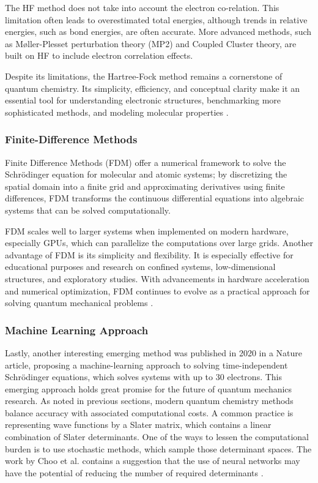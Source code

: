 The HF method does not take into account the electron co-relation. This limitation often leads to overestimated total energies, although trends in relative energies, such as bond energies, are often accurate. More advanced methods, such as Møller-Plesset perturbation theory (MP2) and Coupled Cluster theory, are built on HF to include electron correlation effects.

Despite its limitations, the Hartree-Fock method remains a cornerstone of quantum chemistry. Its simplicity, efficiency, and conceptual clarity make it an essential tool for understanding electronic structures, benchmarking more sophisticated methods, and modeling molecular properties \cite{thijssen2007}.

\subsubsection{Finite-Difference Methods}

Finite Difference Methods (FDM) offer a numerical framework to solve the Schrödinger equation for molecular and atomic systems; by discretizing the spatial domain into a finite grid and approximating derivatives using finite differences, FDM transforms the continuous differential equations into algebraic systems that can be solved computationally.

FDM scales well to larger systems when implemented on modern hardware, especially GPUs, which can parallelize the computations over large grids. Another advantage of FDM is its simplicity and flexibility. It is especially effective for educational purposes and research on confined systems, low-dimensional structures, and exploratory studies. With advancements in hardware acceleration and numerical optimization, FDM continues to evolve as a practical approach for solving quantum mechanical problems \cite{IzaacWang2018ComputationalQM}.

\subsubsection{Machine Learning Approach}

Lastly, another interesting emerging method was published in 2020 in a Nature article, proposing a machine-learning approach to solving time-independent Schr{\"o}dinger equations, which solves systems with up to 30 electrons. This emerging approach holds great promise for the future of quantum mechanics research. As noted in previous sections, modern quantum chemistry methods balance accuracy with associated computational costs. A common practice is representing wave functions by a Slater matrix, which contains a linear combination of Slater determinants. One of the ways to lessen the computational burden is to use stochastic methods, which sample those determinant spaces. The work by Choo et al. contains a suggestion that the use of neural networks may have the potential of reducing the number of required determinants \cite{choo}.

